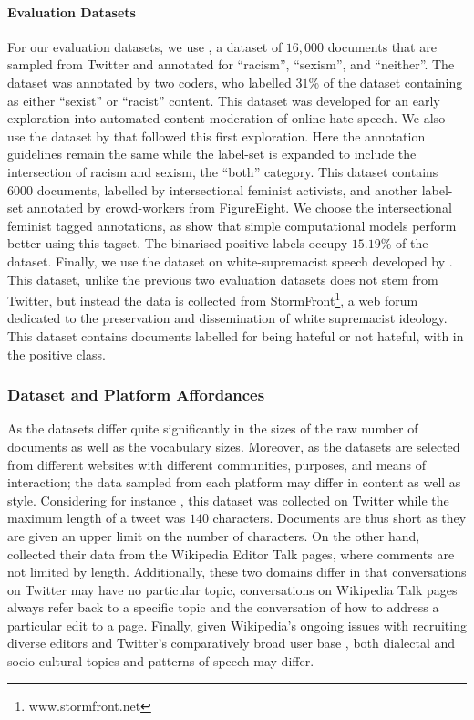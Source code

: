 \paragraph{Evaluation Datasets}
For our evaluation datasets, we use \citet{Waseem-Hovy:2016}, a dataset of $16,000$ documents that are sampled from Twitter and annotated for ``racism'', ``sexism'', and ``neither''. The dataset was annotated by two coders, who labelled $31$\% of the dataset containing as either ``sexist'' or ``racist'' content. This dataset was developed for an early exploration into automated content moderation of online hate speech. We also use the dataset by \citet{Waseem:2016} that followed this first exploration. Here the annotation guidelines remain the same while the label-set is expanded to include the intersection of racism and sexism, the ``both'' category. This dataset contains $6000$ documents, labelled by intersectional feminist activists, and another label-set annotated by crowd-workers from FigureEight. We choose the intersectional feminist tagged annotations, as \citet{Waseem:2016} show that simple computational models perform better using this tagset. The binarised positive labels occupy $15.19$\% of the dataset. Finally, we use the dataset on white-supremacist speech developed by \citet{Garcia:2019}. This dataset, unlike the previous two evaluation datasets does not stem from Twitter, but instead the data is collected from StormFront\footnote{www.stormfront.net}, a web forum dedicated to the preservation and dissemination of white supremacist ideology. This dataset contains  documents labelled for being hateful or not hateful, with  in the positive class.

\subsubsection{Dataset and Platform Affordances}

As the datasets differ quite significantly in the sizes of the raw number of documents as well as the vocabulary sizes. Moreover, as the datasets are selected from different websites with different communities, purposes, and means of interaction; the data sampled from each platform may differ in content as well as style. Considering for instance \citet{Waseem:2016}, this dataset was collected on Twitter while the maximum length of a tweet was $140$ characters. Documents are thus short as they are given an upper limit on the number of characters. On the other hand, \citet{Wulczyn:2017} collected their data from the Wikipedia Editor Talk pages, where comments are not limited by length. Additionally, these two domains differ in that conversations on Twitter may have no particular topic, conversations on Wikipedia Talk pages always refer back to a specific topic and the conversation of how to address a particular edit to a page. Finally, given Wikipedia's ongoing issues with recruiting diverse editors \cite{CITE: Wikipedia editors issue} and Twitter's comparatively broad user base \cite{CITE: Twitter userbase by demographic ref}, both dialectal and socio-cultural topics and patterns of speech may differ.


